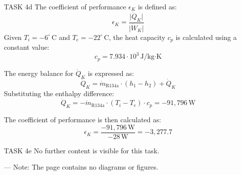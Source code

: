 TASK 4d  
The coefficient of performance \( \epsilon_K \) is defined as:  
\[
\epsilon_K = \frac{\lvert \dot{Q}_K \rvert}{\lvert \dot{W}_K \rvert}
\]  
Given \( T_i = -6^\circ \, \text{C} \) and \( T_e = -22^\circ \, \text{C} \), the heat capacity \( c_p \) is calculated using a constant value:  
\[
c_p = 7.934 \cdot 10^3 \, \text{J/kg·K}
\]  

The energy balance for \( \dot{Q}_K \) is expressed as:  
\[
\dot{Q}_K = \dot{m}_{\text{R134a}} \cdot (h_1 - h_2) + \dot{Q}_K
\]  
Substituting the enthalpy difference:  
\[
\dot{Q}_K = -\dot{m}_{\text{R134a}} \cdot (T_i - T_e) \cdot c_p = -91,796 \, \text{W}
\]  

The coefficient of performance is then calculated as:  
\[
\epsilon_K = \frac{-91,796 \, \text{W}}{-28 \, \text{W}} = -3,277.7
\]  

TASK 4e  
No further content is visible for this task.  

---  
Note: The page contains no diagrams or figures.
